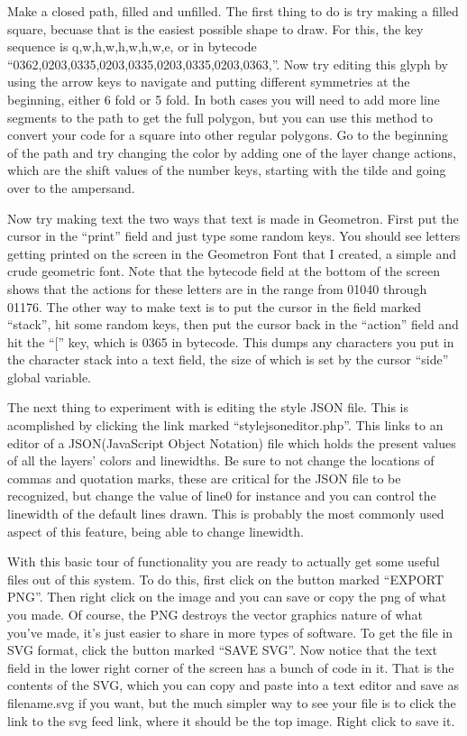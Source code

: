 \documentclass[11pt]{article}
\begin{document}
Make a closed path, filled and unfilled.  The first thing to do is try making a filled square, becuase that is the easiest possible shape to draw.  For this, the key sequence is q,w,h,w,h,w,h,w,e, or in bytecode ``0362,0203,0335,0203,0335,0203,0335,0203,0363,''.  Now try editing this glyph by using the arrow keys to navigate and putting different symmetries at the beginning, either 6 fold or 5 fold.  In both cases you will need to add more line segments to the path to get the full polygon, but you can use this method to convert your code for a square into other regular polygons.  Go to the beginning of the path and try changing the color by adding one of the layer change actions, which are the shift values of the number keys, starting with the tilde and going over to the ampersand.  

Now try making text the two ways that text is made in Geometron.  First put the cursor in the ``print'' field and just type some random keys.  You should see letters getting printed on the screen in the Geometron Font that I created, a simple and crude geometric font.  Note that the bytecode field at the bottom of the screen shows that the actions for these letters are in the range from 01040 through 01176. The other way to make text is to put the cursor in the field marked ``stack'', hit some random keys, then put the cursor back in the ``action'' field and hit the ``['' key, which is 0365 in bytecode.  This dumps any characters you put in the character stack into a text field, the size of which is set by the cursor ``side'' global variable. 

The next thing to experiment with is editing the style JSON file.  This is acomplished by clicking the link marked ``stylejsoneditor.php''.  This links to an editor of a JSON(JavaScript Object Notation) file which holds the present values of all the layers' colors and linewidths.  Be sure to not change the locations of commas and quotation marks, these are critical for the JSON file to be recognized, but change the value of line0 for instance and you can control the linewidth of the default lines drawn.  This is probably the most commonly used aspect of this feature, being able to change linewidth.

With this basic tour of functionality you are ready to actually get some useful files out of this system.  To do this, first click on the button marked ``EXPORT PNG''.  Then right click on the image and you can save or copy the png of what you made.  Of course, the PNG destroys the vector graphics nature of what you've made, it's just easier to share in more types of software.  To get the file in SVG format, click the button marked ``SAVE SVG''.  Now notice that the text field in the lower right corner of the screen has a bunch of code in it.  That is the contents of the SVG, which you can copy and paste into a text editor and save as filename.svg if you want, but the much simpler way to see your file is to click the link to the svg feed link, where it should be the top image.  Right click to save it.
\end{document}
